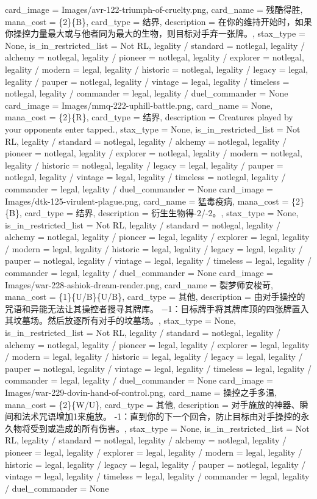 \documentclass[lang = cn, color = black, 10pt]{AllThatStax}
\begin{document}
\card
{
	card_image = Images/avr-122-triumph-of-cruelty.png,
	card_name = 残酷得胜,
	mana_cost = \{2\}\{B\},
	card_type = 结界,
	description = 在你的维持开始时，如果你操控力量最大或与他者同为最大的生物，则目标对手弃一张牌。,
	stax_type = None,
	is_in_restricted_list = Not RL,
	legality / standard = notlegal,
	legality / alchemy = notlegal,
	legality / pioneer = notlegal,
	legality / explorer = notlegal,
	legality / modern = legal,
	legality / historic = notlegal,
	legality / legacy = legal,
	legality / pauper = notlegal,
	legality / vintage = legal,
	legality / timeless = notlegal,
	legality / commander = legal,
	legality / duel_commander = None
}
\card
{
	card_image = Images/mmq-222-uphill-battle.png,
	card_name = None,
	mana_cost = \{2\}\{R\},
	card_type = 结界,
	description = Creatures played by your opponents enter tapped.,
	stax_type = None,
	is_in_restricted_list = Not RL,
	legality / standard = notlegal,
	legality / alchemy = notlegal,
	legality / pioneer = notlegal,
	legality / explorer = notlegal,
	legality / modern = notlegal,
	legality / historic = notlegal,
	legality / legacy = legal,
	legality / pauper = notlegal,
	legality / vintage = legal,
	legality / timeless = notlegal,
	legality / commander = legal,
	legality / duel_commander = None
}
\card
{
	card_image = Images/dtk-125-virulent-plague.png,
	card_name = 猛毒疫病,
	mana_cost = \{2\}\{B\},
	card_type = 结界,
	description = 衍生生物得-2/-2。,
	stax_type = None,
	is_in_restricted_list = Not RL,
	legality / standard = notlegal,
	legality / alchemy = notlegal,
	legality / pioneer = legal,
	legality / explorer = legal,
	legality / modern = legal,
	legality / historic = legal,
	legality / legacy = legal,
	legality / pauper = notlegal,
	legality / vintage = legal,
	legality / timeless = legal,
	legality / commander = legal,
	legality / duel_commander = None
}
\card
{
	card_image = Images/war-228-ashiok-dream-render.png,
	card_name = 裂梦师安梭苛,
	mana_cost = \{1\}\{U/B\}\{U/B\},
	card_type = 其他,
	description = 由对手操控的咒语和异能无法让其操控者搜寻其牌库。
	−1：目标牌手将其牌库顶的四张牌置入其坟墓场。然后放逐所有对手的坟墓场。,
	stax_type = None,
	is_in_restricted_list = Not RL,
	legality / standard = notlegal,
	legality / alchemy = notlegal,
	legality / pioneer = legal,
	legality / explorer = legal,
	legality / modern = legal,
	legality / historic = legal,
	legality / legacy = legal,
	legality / pauper = notlegal,
	legality / vintage = legal,
	legality / timeless = legal,
	legality / commander = legal,
	legality / duel_commander = None
}
\card
{
	card_image = Images/war-229-dovin-hand-of-control.png,
	card_name = 操控之手多温,
	mana_cost = \{2\}\{W/U\},
	card_type = 其他,
	description = 对手施放的神器、瞬间和法术咒语增加{1}来施放。
	-1：直到你的下一个回合，防止目标由对手操控的永久物将受到或造成的所有伤害。,
	stax_type = None,
	is_in_restricted_list = Not RL,
	legality / standard = notlegal,
	legality / alchemy = notlegal,
	legality / pioneer = legal,
	legality / explorer = legal,
	legality / modern = legal,
	legality / historic = legal,
	legality / legacy = legal,
	legality / pauper = notlegal,
	legality / vintage = legal,
	legality / timeless = legal,
	legality / commander = legal,
	legality / duel_commander = None
}
\end{document}
